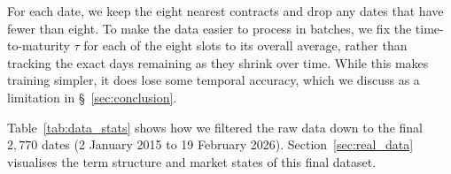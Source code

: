 \documentclass[11pt, a4paper]{article}
\begin{document}
For each date, we keep the eight nearest contracts and drop any dates that have fewer than eight. To make the data easier to process in batches, we fix the time-to-maturity $\tau$ for each of the eight slots to its overall average, rather than tracking the exact days remaining as they shrink over time. While this makes training simpler, it does lose some temporal accuracy, which we discuss as a limitation in \S~\ref{sec:conclusion}.

Table~\ref{tab:data_stats} shows how we filtered the raw data down to the final $2{,}770$ dates (2 January 2015 to 19 February 2026). Section~\ref{sec:real_data} visualises the term structure and market states of this final dataset.

\begin{table}[htbp]
\centering
\caption{Descriptive statistics for the real WTI futures panel}
\label{tab:data_stats}
\begin{threeparttable}
\end{threeparttable}
\end{table}
\end{document}
